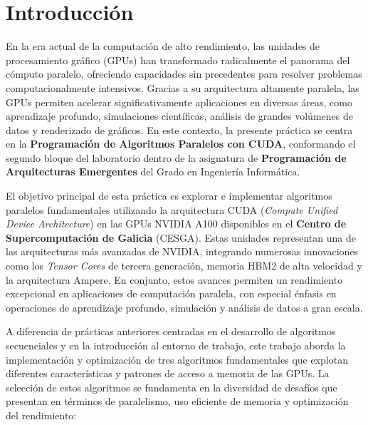 \chapter{Introducción}

En la era actual de la computación de alto rendimiento, las unidades de procesamiento gráfico (GPUs) han transformado radicalmente el panorama del cómputo paralelo, ofreciendo capacidades sin precedentes para resolver problemas computacionalmente intensivos. Gracias a su arquitectura altamente paralela, las GPUs permiten acelerar significativamente aplicaciones en diversas áreas, como aprendizaje profundo, simulaciones científicas, análisis de grandes volúmenes de datos y renderizado de gráficos. En este contexto, la presente práctica se centra en la \textbf{Programación de Algoritmos Paralelos con CUDA}, conformando el segundo bloque del laboratorio dentro de la asignatura de \textbf{Programación de Arquitecturas Emergentes} del Grado en Ingeniería Informática.

El objetivo principal de esta práctica es explorar e implementar algoritmos paralelos fundamentales utilizando la arquitectura CUDA (\textit{Compute Unified Device Architecture}) en las GPUs NVIDIA A100 disponibles en el \textbf{Centro de Supercomputación de Galicia} (CESGA). Estas unidades representan una de las arquitecturas más avanzadas de NVIDIA, integrando numerosas innovaciones como los \textit{Tensor Cores} de tercera generación, memoria HBM2 de alta velocidad y la arquitectura Ampere. En conjunto, estos avances permiten un rendimiento excepcional en aplicaciones de computación paralela, con especial énfasis en operaciones de aprendizaje profundo, simulación y análisis de datos a gran escala.

A diferencia de prácticas anteriores centradas en el desarrollo de algoritmos secuenciales y en la introducción al entorno de trabajo, este trabajo aborda la implementación y optimización de tres algoritmos fundamentales que explotan diferentes características y patrones de acceso a memoria de las GPUs. La selección de estos algoritmos se fundamenta en la diversidad de desafíos que presentan en términos de paralelismo, uso eficiente de memoria y optimización del rendimiento:

